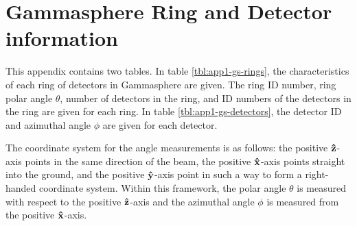 %
%

\chapter{Gammasphere Ring and Detector information}
\label{app:gs-rings-and-detectors}
This appendix contains two tables. In table \ref{tbl:app1-gs-rings}, the characteristics of each ring of detectors in Gammasphere are given. The ring ID number, ring polar angle $\theta$, number of detectors in the ring, and ID numbers of the detectors in the ring are given for each ring. In table \ref{tbl:app1-gs-detectors}, the detector ID and azimuthal angle $\phi$ are given for each detector.

The coordinate system for the angle measurements is as follows: the positive $\boldsymbol{\hat{\textbf{z}}}$-axis points in the same direction of the beam, the positive $\boldsymbol{\hat{\textbf{x}}}$-axis points straight into the ground, and the positive $\boldsymbol{\hat{\textbf{y}}}$-axis point in such a way to form a right-handed coordinate system. Within this framework, the polar angle $\theta$ is measured with respect to the positive $\boldsymbol{\hat{\textbf{z}}}$-axis and the azimuthal angle $\phi$ is measured from the positive $\boldsymbol{\hat{\textbf{x}}}$-axis.

